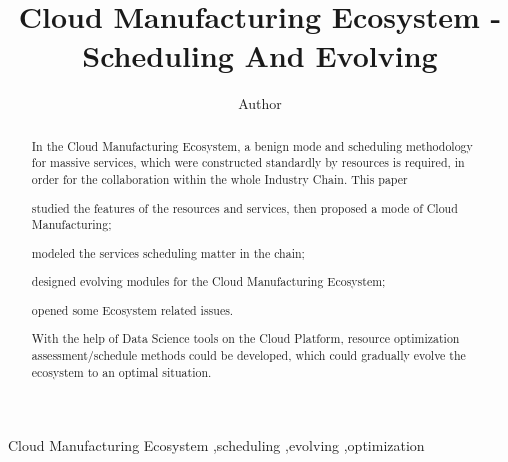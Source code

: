 
\title{Cloud Manufacturing Ecosystem - Scheduling And Evolving}

\author[label1]{Author}
\address[label1]{ZJU}
\begin{abstract}
In the Cloud Manufacturing Ecosystem, a benign mode and scheduling methodology for massive services, which were constructed standardly by resources is required, in order for the collaboration within the whole Industry Chain.
This paper 
\begin{inparaenum}[1)]
\item studied the features of the resources and services, then proposed a mode of Cloud Manufacturing;
\item modeled the services scheduling matter in the chain;
\item designed evolving modules for the Cloud Manufacturing Ecosystem;
\item opened some Ecosystem related issues. 
\end{inparaenum}
With the help of Data Science tools on the Cloud Platform, resource optimization assessment/schedule methods could be developed, which could
gradually evolve the ecosystem to an optimal situation.

\end{abstract}

\begin{keyword}
Cloud Manufacturing  Ecosystem \sep scheduling \sep evolving \sep optimization
\end{keyword}